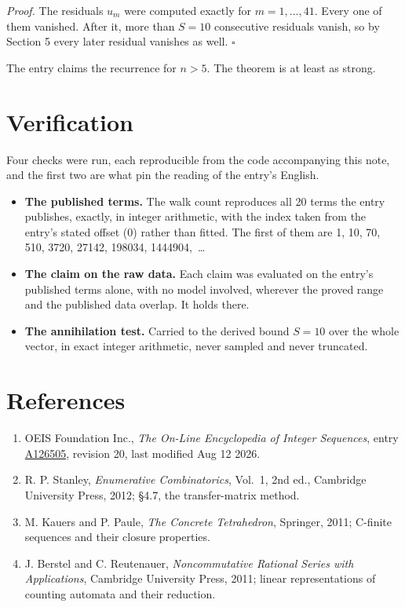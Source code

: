 \documentclass[11pt]{article}
\theoremstyle{definition}
\begin{document}
{\itshape Proof.} The residuals $u_m$ were computed exactly for $m = 1,\dots,41$. Every one of them vanished. After it, more than $S = 10$ consecutive residuals vanish, so by Section 5 every later residual vanishes as well. $\square$

The entry claims the recurrence for $n > 5$. The theorem is at least as strong.

\section{Verification}

Four checks were run, each reproducible from the code accompanying this note, and the first two are what pin the reading of the entry's English.

\begin{itemize}

\item {\bfseries The published terms.} The walk count reproduces all 20 terms the entry publishes, exactly, in integer arithmetic, with the index taken from the entry's stated offset (0) rather than fitted. The first of them are 1, 10, 70, 510, 3720, 27142, 198034, 1444904,~\dots

\item {\bfseries The claim on the raw data.} Each claim was evaluated on the entry's published terms alone, with no model involved, wherever the proved range and the published data overlap. It holds there.

\item {\bfseries The annihilation test.} Carried to the derived bound $S = 10$ over the whole vector, in exact integer arithmetic, never sampled and never truncated.

\end{itemize}

\section{References}

\begin{enumerate}

\item OEIS Foundation Inc., \emph{The On-Line Encyclopedia of Integer Sequences}, entry \href{https://oeis.org/A126505}{A126505}, revision 20, last modified Aug 12 2026.

\item R. P. Stanley, \emph{Enumerative Combinatorics}, Vol.~1, 2nd ed., Cambridge University Press, 2012; \S4.7, the transfer-matrix method.

\item M. Kauers and P. Paule, \emph{The Concrete Tetrahedron}, Springer, 2011; C-finite sequences and their closure properties.

\item J. Berstel and C. Reutenauer, \emph{Noncommutative Rational Series with Applications}, Cambridge University Press, 2011; linear representations of counting automata and their reduction.

\end{enumerate}
\end{document}
